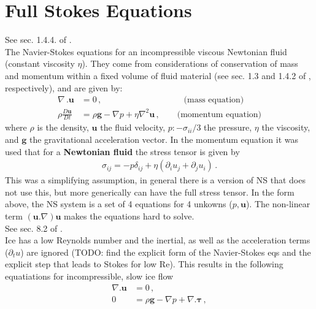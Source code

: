 \documentclass[11pt,a4paper]{article}
\newcommand{\p}{\partial}
\begin{document}
\section{Full Stokes Equations}

See sec. 1.4.4. of \cite{karthaus_notes}.
\\
The Navier-Stokes equations for an incompressible viscous Newtonian fluid (constant viscosity $\eta$). They come from considerations of conservation of mass and momentum within a fixed volume of fluid material (see sec. 1.3 and 1.4.2 of \cite{karthaus_notes}, respectively), and are given by:
\begin{subequations}
\begin{align}
    \nabla \, . \mathbf{u} &= 0 \,, 
    \hspace{4cm} \text{(mass equation)}
    \label{NS:mass_eq}
    \\
    \rho \frac{D \mathbf{u}}{D t} &= 
    \rho \mathbf{g} - \nabla p + \eta \nabla^2 \mathbf{u}
    \,,
    \qquad \text{(momentum equation)}
    \label{NS:mom_eq}
\end{align}
\end{subequations}
where $\rho$ is the density, $\mathbf{u}$ the fluid velocity, $p : - \sigma_{ii}/3$ the pressure, $\eta$ the viscosity, and $\mathbf{g}$ the gravitational acceleration vector. In the momentum equation it was used that for a \textbf{Newtonian fluid} the stress tensor is given by 
\begin{align}    
    \sigma_{ij} = - p \delta_{ij} + \eta \left( \p_i u_j + \p_j u_i \right) \,.
\end{align}
This was a simplifying assumption, in general there is a version of NS that does not use this, but more generically can have the full stress tensor. In the form above, the NS system is a set of 4 equations for 4 unkowns ($p, \mathbf{u}$). The non-linear term $(\mathbf{u} . \nabla) \mathbf{u}$ makes the equations hard to solve.
\\[10pt]
See sec. 8.2 of \cite{karthaus_notes}.
\\
Ice has a low Reynolds number and the inertial, as well as the acceleration terms ($\p_t u$) are ignored (TODO: find the explicit form of the Navier-Stokes eqs and the explicit step that leads to Stokes for low Re). This results in the following equatiations for incompressible, slow ice flow
\begin{subequations}
\begin{align}
    \nabla . \mathbf{u} & = 0
    \,, 
    \label{Stokes:mass_eq}
    \\
    0 & = \rho \mathbf{g} - \nabla p + \nabla . \mathbf{\tau}
    \,,
    \label{Stokes:mom_eq}
\end{align}
\end{subequations}
\end{document}
